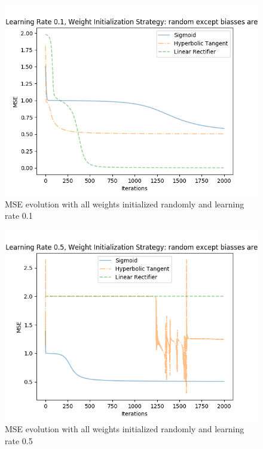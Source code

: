 \documentclass{article}
\begin{document}
\begin{figure}[H]
\centering
\includegraphics[width=0.9\linewidth]{img/mse_randomexceptbiassesare1_01.png}
\caption{MSE evolution with all weights initialized randomly and learning rate 0.1}
\label{fig:mser01}
\end{figure}
\begin{figure}[H]
\centering
\includegraphics[width=0.9\linewidth]{img/mse_randomexceptbiassesare1_05.png}
\caption{MSE evolution with all weights initialized randomly and learning rate 0.5}
\label{fig:mser05}
\end{figure}
\end{document}
